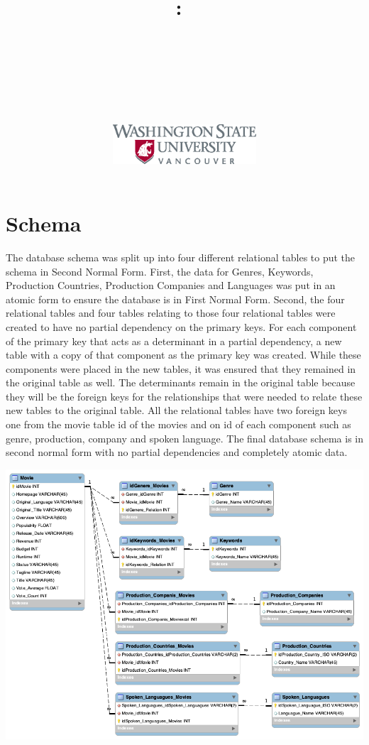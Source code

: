 \documentclass{article}
\title{
    \vspace{2in}
    \textmd{\textbf{\hmwkClass:\ \hmwkTitle}}\\
    \normalsize\vspace{0.1in}\large{\ \ \hmwkDueDate}\\
    \vspace{0.1in}\large{\textbf{\hmwkClassInstructor\ \hmwkClassTime}}\\
    \vspace{0.5in}
    \large{\textbf{\hmwkAuthorName}}\\
    \date{}
    \vfill
    \includegraphics[width=0.4\textwidth]{logo.eps}
}
\begin{document}
\maketitle

\pagebreak

\section{Schema}

The database schema was split up into four different relational tables to put the schema in Second Normal Form. First, the data for Genres, Keywords, Production Countries, Production Companies and Languages was put in an atomic form to ensure the database is in First Normal Form. Second, the four relational tables and four tables relating to those four relational tables were created to have no partial dependency on the primary keys. For each component of the primary key that acts as a determinant in a partial dependency, a new table with a copy of that component as the primary key was created. While these components were placed in the new tables, it was ensured that they remained in the original table as well. The determinants remain in the original table because they will be the foreign keys for the relationships that were needed to relate these new tables to the original table. All the relational tables have two foreign keys one from the movie table id of the movies and on id of each component such as genre, production, company and spoken language. The final database schema is in second normal form with no partial dependencies and completely atomic data.\newline 

\includegraphics[width=1\textwidth]{ERR.png}
\end{document}
